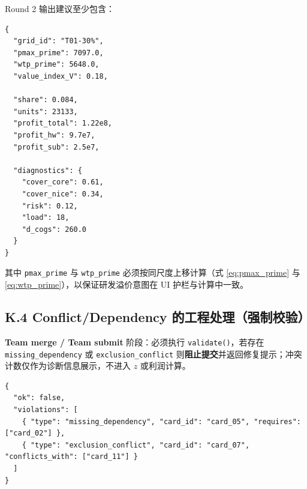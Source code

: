 \documentclass[UTF8,12pt]{ctexart}
\begin{document}
Round 2 输出建议至少包含：
\begin{verbatim}
{
  "grid_id": "T01-30%",
  "pmax_prime": 7097.0,
  "wtp_prime": 5648.0,
  "value_index_V": 0.18,

  "share": 0.084,
  "units": 23133,
  "profit_total": 1.22e8,
  "profit_hw": 9.7e7,
  "profit_sub": 2.5e7,

  "diagnostics": {
    "cover_core": 0.61,
    "cover_nice": 0.34,
    "risk": 0.12,
    "load": 18,
    "d_cogs": 260.0
  }
}
\end{verbatim}

其中 \texttt{pmax\_prime} 与 \texttt{wtp\_prime} 必须按同尺度上移计算（式 \eqref{eq:pmax_prime} 与 \eqref{eq:wtp_prime}），以保证研发溢价意图在 UI 护栏与计算中一致。

\subsection{K.4 Conflict/Dependency 的工程处理（强制校验）}
\textbf{Team merge / Team submit} 阶段：必须执行 \texttt{validate()}，若存在
\texttt{missing\_dependency} 或 \texttt{exclusion\_conflict} 则\textbf{阻止提交}并返回修复提示；冲突计数仅作为诊断信息展示，不进入 $z$ 或利润计算。
\begin{verbatim}
{
  "ok": false,
  "violations": [
    { "type": "missing_dependency", "card_id": "card_05", "requires": ["card_02"] },
    { "type": "exclusion_conflict", "card_id": "card_07", "conflicts_with": ["card_11"] }
  ]
}
\end{verbatim}
\end{document}
